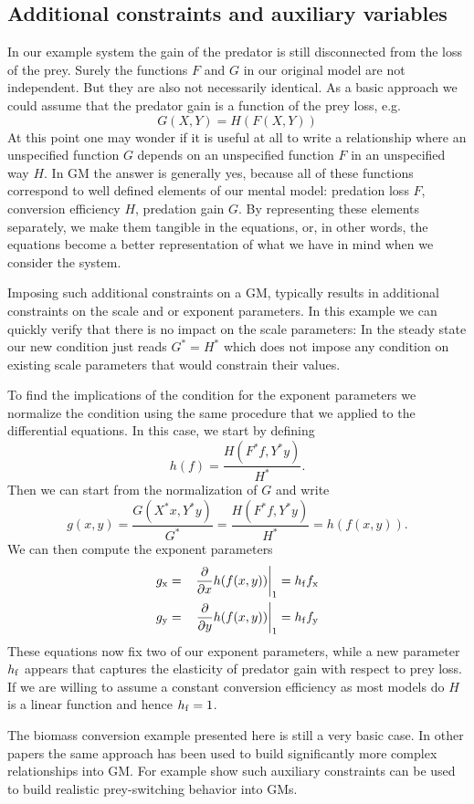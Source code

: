 \documentclass{article}
\newcommand{\eq}[1]{\begin{equation}#1\end{equation}}
\newcommand{\eqa}[1]{\begin{eqnarray}#1\end{eqnarray}}
\begin{document}
\subsection{Additional constraints and auxiliary variables}
In our example system the gain of the predator is still disconnected from the loss of the prey. Surely the functions $F$ and $G$ in our original model are not independent. But they are also not necessarily identical. As a basic approach we could assume that the predator gain is a function of the prey loss, e.g.~
\eq{
G(X,Y)=H(F(X,Y))
}
At this point one may wonder if it is useful at all to write a relationship where an unspecified function $G$ depends on an unspecified function $F$ in an unspecified way $H$. In GM the answer is generally yes, because all of these functions correspond to well defined elements of our mental model: predation loss $F$, conversion efficiency $H$, predation gain $G$.
By representing these elements separately, we make them tangible in the equations, or, in other words, the equations become a better representation of what we have in mind when we consider the system. 

Imposing such additional constraints on a GM, typically results in additional constraints on the scale and or exponent parameters. In this example we can quickly verify that there is no impact on the scale parameters: In the steady state our new condition just reads $G^*=H^*$ which does not impose any condition on existing scale parameters that would constrain their values. 

To find the implications of the condition for the exponent parameters we normalize the condition using the same procedure that we applied to the differential equations. In this case, we start by defining 
\eq{
h(f)=\frac{H(F^*f,Y^*y)}{H^*}.
}
Then we can start from the normalization of $G$ and write 
\eq{
g(x,y) = \frac{G(X^*x,Y^*y)}{G^*} = \frac{H(F^*f,Y^*y)}{H^*} = h(f(x,y)). 
}
We can then compute the exponent parameters 
\eqa{
g_{\rm x} &=& \left.\frac{\partial}{\partial x} h(f(x,y))\right|_1 = h_{\rm f}f_{\rm x} \\ 
g_{\rm y} &=& \left.\frac{\partial}{\partial y} h(f(x,y))\right|_1 = h_{\rm f}f_{\rm y} 
}
These equations now fix two of our exponent parameters, while a new parameter $h_{\rm f}$ appears that captures the elasticity of predator gain with respect to prey loss. If we are willing to assume a constant conversion efficiency as most models do $H$ is a linear function and hence $h_{\rm f}=1$. 

The biomass conversion example presented here is still a very basic case. In other papers the same approach has been used to build significantly more complex relationships into GM. For example \cite{Gross2006PRE} show such auxiliary constraints can be used to build realistic prey-switching behavior into GMs. 
\end{document}
